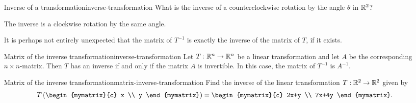 \begin{example}{Inverse of a transformation}{inverse-transformation}
  What is the inverse of a counterclockwise rotation by the angle
  $\theta$ in $\mathbb{R}^2$?
\end{example}

\begin{solution}
  The inverse is a clockwise rotation by the same angle.
\end{solution}

It is perhaps not entirely unexpected that the matrix of $T^{-1}$ is
exactly the inverse of the matrix of $T$, if it exists.

\begin{theorem}{Matrix of the inverse transformation}{inverse-transformation}
  Let $T:\mathbb{R}^n \to \mathbb{R}^n$ be a linear transformation and let $A$ be the
  corresponding $n\times n$-matrix. Then $T$ has an inverse if and
  only if the matrix $A$ is invertible. In this case, the matrix of
  $T^{-1}$ is $A^{-1}$.
\end{theorem}

\begin{example}{Matrix of the inverse transformation}{matrix-inverse-transformation}
  Find the inverse of the linear transformation $T:\mathbb{R}^2\to\mathbb{R}^2$ given
  by
  \begin{equation*}
    T\tup{\begin{mymatrix}{c} x \\ y \end{mymatrix}}
    = \begin{mymatrix}{c} 2x+y \\ 7x+4y \end{mymatrix}.
  \end{equation*}
\end{example}

